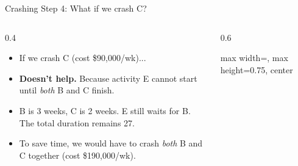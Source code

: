 \documentclass[11pt,aspectratio=169]{beamer}
\begin{document}
\begin{frame}{Crashing Step 4: What if we crash C?}
    \begin{columns}[T]
    \begin{column}{0.4\textwidth}
        \small
        \begin{itemize}
            \item If we crash C (cost \$90,000/wk)...
            \item \textbf{Doesn't help.} Because activity E cannot start until \emph{both} B and C finish.
            \item B is 3 weeks, C is 2 weeks. E still waits for B. The total duration remains 27.
            \item To save time, we would have to crash \emph{both} B and C together (cost \$190,000/wk).
        \end{itemize}
    \end{column}
    \begin{column}{0.6\textwidth}
        \begin{adjustbox}{max width=\linewidth, max height=0.75\textheight, center}
\end{adjustbox}
\end{column}
\end{columns}
\end{frame}
\end{document}
